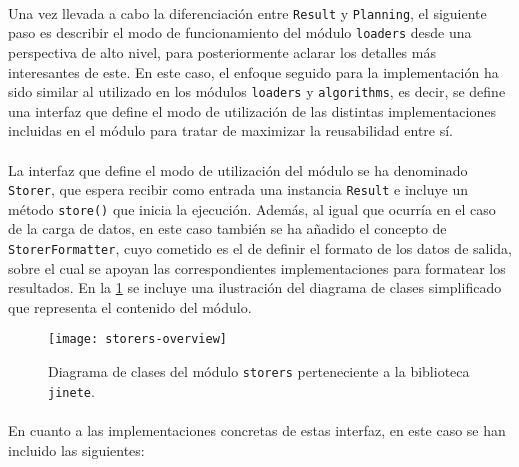 \documentclass{subfiles}
\begin{document}
          \paragraph{}
          Una vez llevada a cabo la diferenciación entre \texttt{Result} y \texttt{Planning}, el siguiente paso es describir el modo de funcionamiento del módulo \texttt{loaders} desde una perspectiva de alto nivel, para posteriormente aclarar los detalles más interesantes de este. En este caso, el enfoque seguido para la implementación ha sido similar al utilizado en los módulos \texttt{loaders} y \texttt{algorithms}, es decir, se define una interfaz que define el modo de utilización de las distintas implementaciones incluidas en el módulo para tratar de maximizar la reusabilidad entre sí.

          \paragraph{}
          La interfaz que define el modo de utilización del módulo se ha denominado \texttt{Storer}, que espera recibir como entrada una instancia \texttt{Result} e incluye un método \verb|store()| que inicia la ejecución. Además, al igual que ocurría en el caso de la carga de datos, en este caso también se ha añadido el concepto de \texttt{StorerFormatter}, cuyo cometido es el de definir el formato de los datos de salida, sobre el cual se apoyan las correspondientes implementaciones para formatear los resultados. En la \cref{img:storers_overview} se incluye una ilustración del diagrama de clases simplificado que representa el contenido del módulo.

          \begin{figure}[!ht]
            \centering
            \texttt{[image: storers-overview]}
            \caption{Diagrama de clases del módulo \texttt{storers} perteneciente a la biblioteca \texttt{jinete}.}
            \label{img:storers_overview}
          \end{figure}

          \paragraph{}
          En cuanto a las implementaciones concretas de estas interfaz, en este caso se han incluido las siguientes:
\end{document}
